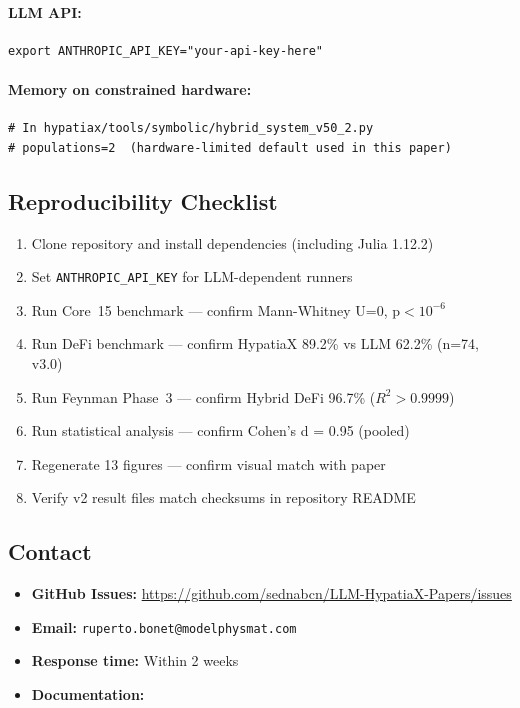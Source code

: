 \documentclass[11pt,a4paper]{article}
\begin{document}
\paragraph{LLM API:}
\begin{small}
\begin{verbatim}
export ANTHROPIC_API_KEY="your-api-key-here"
\end{verbatim}
\end{small}

\paragraph{Memory on constrained hardware:}
\begin{small}
\begin{verbatim}
# In hypatiax/tools/symbolic/hybrid_system_v50_2.py
# populations=2  (hardware-limited default used in this paper)
\end{verbatim}
\end{small}

\subsection{Reproducibility Checklist}

\begin{enumerate}
\item Clone repository and install dependencies (including Julia 1.12.2)
\item Set \texttt{ANTHROPIC\_API\_KEY} for LLM-dependent runners
\item Run Core~15 benchmark — confirm Mann-Whitney U=0, p$<10^{-6}$
\item Run DeFi benchmark — confirm HypatiaX 89.2\% vs LLM 62.2\% (n=74, v3.0)
\item Run Feynman Phase~3 — confirm Hybrid DeFi 96.7\% ($R^2>0.9999$)
\item Run statistical analysis — confirm Cohen's d = 0.95 (pooled)
\item Regenerate 13 figures — confirm visual match with paper
\item Verify v2 result files match checksums in repository README
\end{enumerate}

\subsection{Contact}

\begin{itemize}
\item \textbf{GitHub Issues:} \url{https://github.com/sednabcn/LLM-HypatiaX-Papers/issues}
\item \textbf{Email:} \texttt{ruperto.bonet@modelphysmat.com}
\item \textbf{Response time:} Within 2 weeks
\item \textbf{Documentation:} 
\end{itemize}
\end{document}
